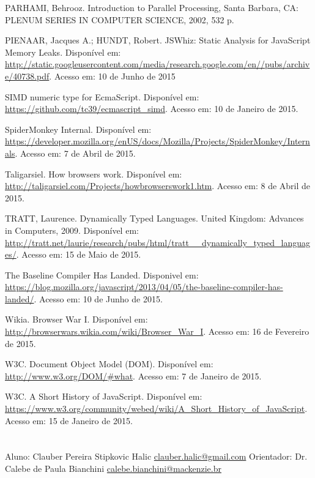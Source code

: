 \documentclass{article}
\begin{document}
PARHAMI, Behrooz. Introduction to Parallel Processing, Santa Barbara, CA: PLENUM SERIES IN COMPUTER SCIENCE, 2002, 532 p.

PIENAAR, Jacques A.; HUNDT, Robert. JSWhiz: Static Analysis for JavaScript Memory Leaks.
Disponível em: \url{http://static.googleusercontent.com/media/research.google.com/en//pubs/archive/40738.pdf}.
Acesso em: 10 de Junho de 2015

SIMD numeric type for EcmaScript.
Disponível em: \url{https://github.com/tc39/ecmascript_simd}.
Acesso em: 10 de Janeiro de 2015.

SpiderMonkey Internal.
Disponível em: \url{https://developer.mozilla.org/enUS/docs/Mozilla/Projects/SpiderMonkey/Internals}.
Acesso em: 7 de Abril de 2015.

Taligarsiel. How browsers work.
Disponível em: \url{http://taligarsiel.com/Projects/howbrowserswork1.htm}.
Acesso em: 8 de Abril de 2015.

TRATT, Laurence. Dynamically Typed Languages. United Kingdom: Advances in Computers, 2009.
Disponível em: \url{http://tratt.net/laurie/research/pubs/html/tratt__dynamically_typed_languages/}.
Acesso em: 15 de Maio de 2015.

The Baseline Compiler Has Landed.
Disponivel em: \url{https://blog.mozilla.org/javascript/2013/04/05/the-baseline-compiler-has-landed/}.
Acesso em: 10 de Junho de 2015.

Wikia. Browser War I.
Disponível em: \url{http://browserwars.wikia.com/wiki/Browser_War_I}.
Acesso em: 16 de Fevereiro de 2015.

W3C. Document Object Model (DOM).
Disponível em: \url{http://www.w3.org/DOM/#what}.
Acesso em: 7 de Janeiro de 2015.

W3C. A Short History of JavaScript.
Disponível em: \url{https://www.w3.org/community/webed/wiki/A_Short_History_of_JavaScript}.
Acesso em: 15 de Janeiro de 2015.



\section{}

Aluno: Clauber Pereira Stipkovic Halic \url{clauber.halic@gmail.com}
Orientador: Dr. Calebe de Paula Bianchini \url{calebe.bianchini@mackenzie.br}






\end{document}
